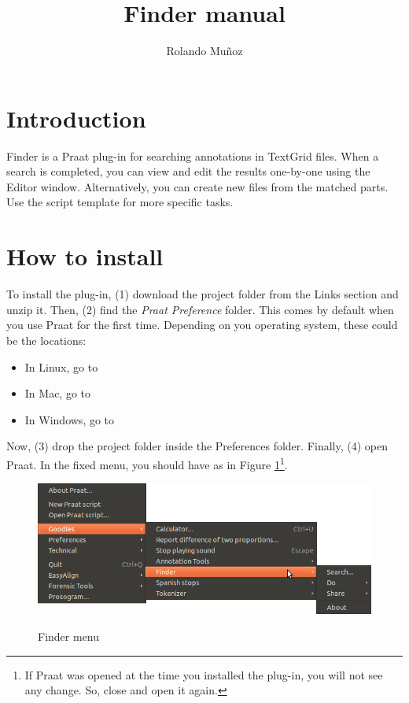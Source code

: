 \documentclass[10pt,a4paper]{article}
\author{Rolando Muñoz}
\title{Finder manual}
\begin{document}
\maketitle

\section{Introduction}
Finder is a Praat plug-in for searching annotations in TextGrid files. When a search is completed, you can view and edit the results one-by-one using the Editor window. Alternatively, you can create new files from the matched parts. Use the script template for more specific tasks.
\section{How to install}
To install the plug-in, (1) download the project folder from the Links section and unzip it. Then, (2) find the \textit{Praat Preference} folder. This comes by default when you use Praat for the first time. Depending on you operating system, these could be the locations:

\begin{itemize}
	\item In Linux, go to 
	\item In Mac, go to 
	\item In Windows, go to 
\end{itemize}

Now, (3) drop the project folder inside the Preferences folder. Finally, (4) open Praat. In the fixed menu, you should have  as in Figure {\tiny }\ref{fig:finder_menu}\footnote{If Praat was opened at the time you installed the plug-in, you will not see any change. So, close and open it again.}.

\begin{figure}
	\centering
	\includegraphics[scale=0.5]{img/004}
	\label{fig:finder_menu}
	\caption{Finder menu}
\end{figure}
\end{document}
